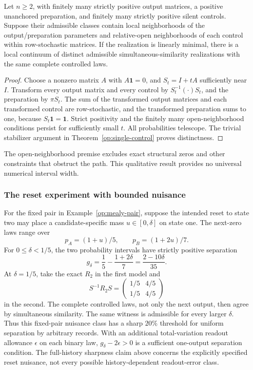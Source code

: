 \begin{proposition}
\label{op:open-calibration}
Let \(n\ge2\), with finitely many strictly positive output matrices,
a positive unanchored preparation, and finitely many strictly positive
silent controls.  Suppose their admissible classes contain local
neighborhoods of the output/preparation parameters and relative-open
neighborhoods of each control within row-stochastic matrices.
If the realization is linearly minimal, there is a local continuum of
distinct admissible simultaneous-similarity realizations with the same
complete controlled laws.
\end{proposition}
\begin{proof}
Choose a nonzero matrix \(A\) with \(A\mathbf1=0\), and
\(S_t=I+tA\) sufficiently near \(I\).
Transform every output matrix and every control by \(S_t^{-1}(\cdot)S_t\),
and the preparation by \(\pi S_t\).
The sum of the transformed output matrices and each transformed control
are row-stochastic, and the transformed preparation sums to one, because
\(S_t\mathbf1=\mathbf1\).
Strict positivity and the finitely many open-neighborhood conditions
persist for sufficiently small \(t\).
All probabilities telescope.  The trivial stabilizer argument in
Theorem~\ref{op:single-control} proves distinctness.
\end{proof}

The open-neighborhood premise excludes exact structural zeros and other
constraints that obstruct the path.  This qualitative result provides
no universal numerical interval width.

\subsubsection{The reset experiment with bounded nuisance}

For the fixed pair in Example~\ref{op:mealy-pair}, suppose the intended
reset to state two may place a candidate-specific mass \(u\in[0,\delta]\)
on state one.  The next-zero laws range over
\[
 p_A=(1+u)/5,\qquad p_B=(1+2u)/7.
\]
For \(0\le\delta<1/5\), the two probability intervals have strictly
positive separation
\[
 g_\delta=\frac15-\frac{1+2\delta}7
          =\frac{2-10\delta}{35}.
\]
At \(\delta=1/5\), take the exact \(R_2\) in the first model and
\[
 S^{-1}R_2S=
 \begin{pmatrix}1/5&4/5\\1/5&4/5\end{pmatrix}
\]
in the second.  The complete controlled laws, not only the next output,
then agree by simultaneous similarity.  The same witness is admissible
for every larger \(\delta\).  Thus this fixed-pair nuisance class has
a sharp \(20\%\) threshold for uniform separation by arbitrary records.
With an additional total-variation readout allowance \(\epsilon\) on
each binary law, \(g_\delta-2\epsilon>0\) is a sufficient one-output
separation condition.  The full-history sharpness claim above concerns
the explicitly specified reset nuisance, not every possible
history-dependent readout-error class.

